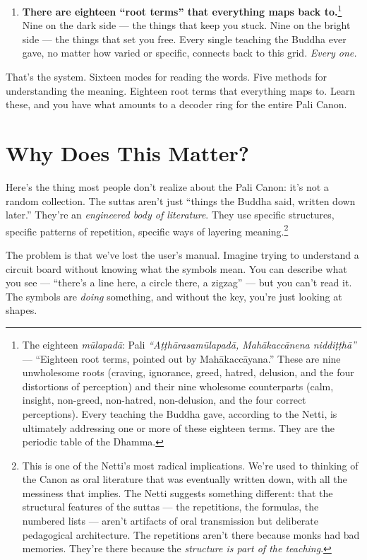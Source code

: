 \begin{enumerate}
\item \textbf{There are eighteen ``root terms'' that everything maps back to.}\footnote{The eighteen \textit{mūlapadā}: Pali \textit{``Aṭṭhārasamūlapadā, Mahākaccānena niddiṭṭhā''} --- ``Eighteen root terms, pointed out by Mahākaccāyana.'' These are nine unwholesome roots (craving, ignorance, greed, hatred, delusion, and the four distortions of perception) and their nine wholesome counterparts (calm, insight, non-greed, non-hatred, non-delusion, and the four correct perceptions). Every teaching the Buddha gave, according to the Netti, is ultimately addressing one or more of these eighteen terms. They are the periodic table of the Dhamma.} Nine on the dark side --- the things that keep you stuck. Nine on the bright side --- the things that set you free. Every single teaching the Buddha ever gave, no matter how varied or specific, connects back to this grid. \textit{Every one.}
\end{enumerate}

That's the system. Sixteen modes for reading the words. Five methods for understanding the meaning. Eighteen root terms that everything maps to. Learn these, and you have what amounts to a decoder ring for the entire Pali Canon.

\ornament

\section*{Why Does This Matter?}

Here's the thing most people don't realize about the Pali Canon: it's not a random collection. The suttas aren't just ``things the Buddha said, written down later.'' They're an \textit{engineered body of literature}. They use specific structures, specific patterns of repetition, specific ways of layering meaning.\footnote{This is one of the Netti's most radical implications. We're used to thinking of the Canon as oral literature that was eventually written down, with all the messiness that implies. The Netti suggests something different: that the structural features of the suttas --- the repetitions, the formulas, the numbered lists --- aren't artifacts of oral transmission but deliberate pedagogical architecture. The repetitions aren't there because monks had bad memories. They're there because the \textit{structure is part of the teaching}.}

The problem is that we've lost the user's manual. Imagine trying to understand a circuit board without knowing what the symbols mean. You can describe what you see --- ``there's a line here, a circle there, a zigzag'' --- but you can't read it. The symbols are \textit{doing} something, and without the key, you're just looking at shapes.

